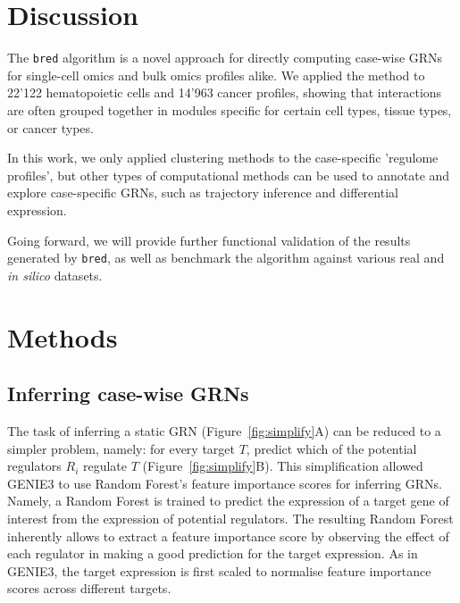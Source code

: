 \section{Discussion}

The \texttt{bred} algorithm is a novel approach for directly computing case-wise GRNs for single-cell omics and bulk omics profiles alike. We applied the method to 22'122 hematopoietic cells and 14'963 cancer profiles, showing that interactions are often grouped together in modules specific for certain cell types, tissue types, or cancer types. 

In this work, we only applied clustering methods to the case-specific 'regulome profiles', but other types of computational methods can be used to annotate and explore case-specific GRNs, such as trajectory inference and differential expression.

Going forward, we will provide further functional validation of the results generated by \texttt{bred}, as well as benchmark the algorithm against various real and \textit{in silico} datasets.


\section{Methods}

\subsection{Inferring case-wise GRNs}
The task of inferring a static GRN (Figure~\ref{fig:simplify}A) can be reduced to a simpler problem, namely: for every target $T$, predict which of the potential regulators $R_i$ regulate $T$ (Figure~\ref{fig:simplify}B). This simplification allowed GENIE3 \cite{huynh-thu_inferringregulatorynetworks_2010} to use Random Forest's \cite{breiman_randomforests_2001} feature importance scores for inferring GRNs. Namely, a Random Forest is trained to predict the expression of a target gene of interest from the expression of potential regulators. The resulting Random Forest inherently allows to extract a feature importance score by observing the effect of each regulator in making a good prediction for the target expression. As in GENIE3, the target expression is first scaled to normalise feature importance scores across different targets.

